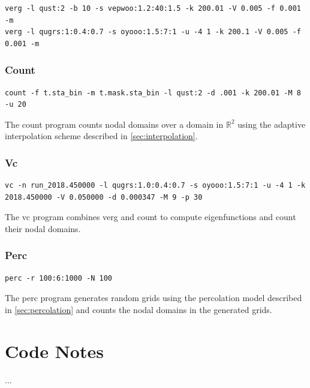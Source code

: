 \documentclass{report}
\begin{document}
\begin{verbatim}
verg -l qust:2 -b 10 -s vepwoo:1.2:40:1.5 -k 200.01 -V 0.005 -f 0.001 -m
verg -l qugrs:1:0.4:0.7 -s oyooo:1.5:7:1 -u -4 1 -k 200.1 -V 0.005 -f 0.001 -m
\end{verbatim}


\subsection{Count}
\begin{verbatim}
count -f t.sta_bin -m t.mask.sta_bin -l qust:2 -d .001 -k 200.01 -M 8 -u 20
\end{verbatim}
The count program counts nodal domains over a domain in $\mathbb{R}^{2}$ using the adaptive interpolation scheme described in \ref{sec:interpolation}.

\subsection{Vc}
\begin{verbatim}
vc -n run_2018.450000 -l qugrs:1.0:0.4:0.7 -s oyooo:1.5:7:1 -u -4 1 -k 2018.450000 -V 0.050000 -d 0.000347 -M 9 -p 30
\end{verbatim}
The vc program combines verg and count to compute eigenfunctions and count their nodal domains.

\subsection{Perc}
\begin{verbatim}
perc -r 100:6:1000 -N 100
\end{verbatim}
The perc program generates random grids using the percolation model described in \ref{sec:percolation} and counts the nodal domains in the generated grids.

\chapter{Code Notes}
...




\end{document}
